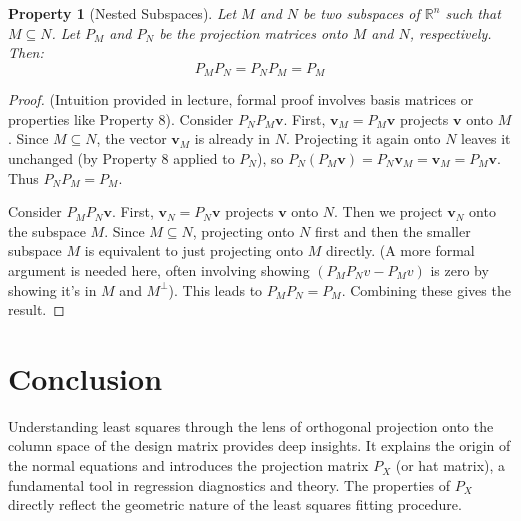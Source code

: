 \documentclass[11pt]{article}
\newtheorem{property}[theorem]{Property}
\theoremstyle{definition}
\newcommand{\vect}[1]{\mathbf{#1}} %
\begin{document}
\begin{property}[Nested Subspaces]
Let $M$ and $N$ be two subspaces of $\mathbb{R}^n$ such that $M \subseteq N$. Let $P_M$ and $P_N$ be the projection matrices onto $M$ and $N$, respectively. Then:
\[ P_M P_N = P_N P_M = P_M \]
\end{property}
\begin{proof}
(Intuition provided in lecture, formal proof involves basis matrices or properties like Property 8).
Consider $P_N P_M \vect{v}$. First, $\vect{v}_M = P_M \vect{v}$ projects $\vect{v}$ onto $M$. Since $M \subseteq N$, the vector $\vect{v}_M$ is already in $N$. Projecting it again onto $N$ leaves it unchanged (by Property 8 applied to $P_N$), so $P_N (P_M \vect{v}) = P_N \vect{v}_M = \vect{v}_M = P_M \vect{v}$. Thus $P_N P_M = P_M$.

Consider $P_M P_N \vect{v}$. First, $\vect{v}_N = P_N \vect{v}$ projects $\vect{v}$ onto $N$. Then we project $\vect{v}_N$ onto the subspace $M$. Since $M \subseteq N$, projecting onto $N$ first and then the smaller subspace $M$ is equivalent to just projecting onto $M$ directly. (A more formal argument is needed here, often involving showing $(P_M P_N v - P_M v)$ is zero by showing it's in $M$ and $M^\perp$). This leads to $P_M P_N = P_M$.
Combining these gives the result.
\end{proof}


\section{Conclusion}

Understanding least squares through the lens of orthogonal projection onto the column space of the design matrix provides deep insights. It explains the origin of the normal equations and introduces the projection matrix $P_X$ (or hat matrix), a fundamental tool in regression diagnostics and theory. The properties of $P_X$ directly reflect the geometric nature of the least squares fitting procedure.
\end{document}

